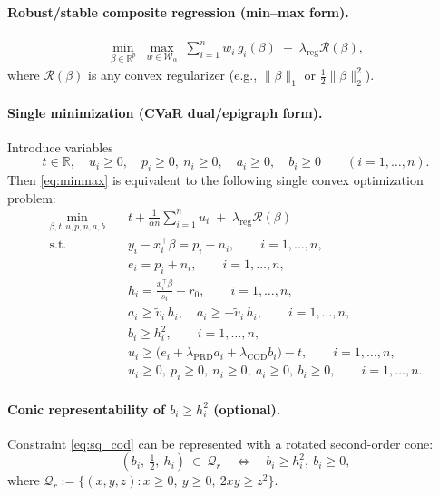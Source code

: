 \documentclass[11pt]{article}
\theoremstyle{plain}
\theoremstyle{definition}
\newcommand{\1}{\mathbf{1}}
\begin{document}
\paragraph{Robust/stable composite regression (min--max form).}
\begin{align}
\min_{\beta\in\mathbb{R}^p}\;
\max_{w\in\mathcal{W}_\alpha}\;
\sum_{i=1}^n w_i\, g_i(\beta)
\;+\; \lambda_{\mathrm{reg}}\mathcal{R}(\beta),
\label{eq:minmax}
\end{align}
where $\mathcal{R}(\beta)$ is any convex regularizer (e.g., $\|\beta\|_1$ or $\tfrac12\|\beta\|_2^2$).

\paragraph{Single minimization (CVaR dual/epigraph form).}
Introduce variables
\[
t\in\mathbb{R},\quad u_i\ge 0,\quad
p_i\ge 0,\ n_i\ge 0,\quad
a_i\ge 0,\quad
b_i\ge 0
\qquad (i=1,\dots,n).
\]
Then \eqref{eq:minmax} is equivalent to the following single convex optimization problem:
\begin{align}
\min_{\beta,t,u,p,n,a,b}\quad
& t + \frac{1}{\alpha n}\sum_{i=1}^n u_i \;+\; \lambda_{\mathrm{reg}}\mathcal{R}(\beta)
\label{eq:final}\\
\text{s.t.}\quad
& y_i - x_i^\top \beta = p_i - n_i, \qquad i=1,\dots,n, \label{eq:lad_lin}\\
& e_i = p_i + n_i, \qquad i=1,\dots,n, \label{eq:e_def}\\
& h_i = \frac{x_i^\top \beta}{s_i} - r_0, \qquad i=1,\dots,n, \label{eq:h_def}\\[2mm]
& a_i \ge \tilde v_i\, h_i,\quad a_i \ge -\tilde v_i\, h_i,\qquad i=1,\dots,n, \label{eq:abs_prd}\\
& b_i \ge h_i^2,\qquad i=1,\dots,n, \label{eq:sq_cod}\\[1mm]
& u_i \ge \Big(e_i + \lambda_{\mathrm{PRD}} a_i + \lambda_{\mathrm{COD}} b_i\Big) - t,\qquad i=1,\dots,n, \label{eq:cvar_slack}\\
& u_i \ge 0,\ p_i\ge 0,\ n_i\ge 0,\ a_i\ge 0,\ b_i\ge 0,\qquad i=1,\dots,n. \label{eq:nonneg}
\end{align}

\paragraph{Conic representability of $b_i \ge h_i^2$ (optional).}
Constraint \eqref{eq:sq_cod} can be represented with a rotated second-order cone:
\[
(b_i,\ \tfrac12,\ h_i)\ \in\ \mathcal{Q}_r
\quad\Longleftrightarrow\quad
b_i \ge h_i^2,\ b_i\ge 0,
\]
where $\mathcal{Q}_r := \{(x,y,z): x\ge 0,\ y\ge 0,\ 2xy \ge z^2\}$.

\end{document}
